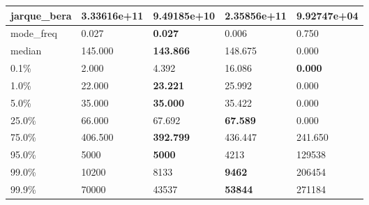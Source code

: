 \begin{table}[H]
\begin{tabular}{|l|m{10em}|m{10em}|m{10em}|m{10em}|}
\hline jarque\_bera & 3.33616e+11 & 9.49185e+10 & \bfseries 2.35856e+11 & \cellcolor[rgb]{0.9, 0.54, 0.52} 9.92747e+04 \\
\hline mode\_freq & 0.027 & \bfseries 0.027 & 0.006 & \cellcolor[rgb]{0.9, 0.54, 0.52} 0.750 \\
\hline median & 145.000 & \bfseries 143.866 & 148.675 & \cellcolor[rgb]{0.9, 0.54, 0.52} 0.000 \\
\hline 0.1\% & 2.000 & 4.392 & \cellcolor[rgb]{0.9, 0.54, 0.52} 16.086 & \bfseries 0.000 \\
\hline 1.0\% & 22.000 & \bfseries 23.221 & 25.992 & \cellcolor[rgb]{0.9, 0.54, 0.52} 0.000 \\
\hline 5.0\% & 35.000 & \bfseries 35.000 & 35.422 & \cellcolor[rgb]{0.9, 0.54, 0.52} 0.000 \\
\hline 25.0\% & 66.000 & 67.692 & \bfseries 67.589 & \cellcolor[rgb]{0.9, 0.54, 0.52} 0.000 \\
\hline 75.0\% & 406.500 & \bfseries 392.799 & 436.447 & \cellcolor[rgb]{0.9, 0.54, 0.52} 241.650 \\
\hline 95.0\% & 5000 & \bfseries 5000 & 4213 & \cellcolor[rgb]{0.9, 0.54, 0.52} 129538 \\
\hline 99.0\% & 10200 & 8133 & \bfseries 9462 & \cellcolor[rgb]{0.9, 0.54, 0.52} 206454 \\
\hline 99.9\% & 70000 & 43537 & \bfseries 53844 & \cellcolor[rgb]{0.9, 0.54, 0.52} 271184 \\
\hline
\end{tabular}
\end{table}
